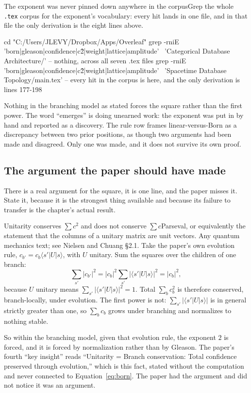 \begin{Correspondence}{The exponent was never pinned down anywhere in the corpus}{Grep the whole \texttt{.tex} corpus for the exponent's vocabulary: every hit lands in one file, and in that file the only derivation is the eight lines above.}
\begin{Check}
cd "C:/Users/JLEVY/Dropbox/Apps/Overleaf"
grep -rniE 'born|gleason|confidence|c\^2|weight|lattice|amplitude' \
     'Categorical Database Architecture/'
    -- nothing, across all seven .tex files
grep -rniE 'born|gleason|confidence|c\^2|weight|lattice|amplitude' \
     'Spacetime Database Topology/main.tex'
    -- every hit in the corpus is here, and the only derivation is lines 177-198
\end{Check}
Nothing in the branching model as stated forces the square rather than the first power. The word ``emerges'' is doing unearned work: the exponent was put in by hand and reported as a discovery. The rule row frames linear-versus-Born as a discrepancy between two prior positions, as though two arguments had been made and disagreed. Only one was made, and it does not survive its own proof.
\end{Correspondence}

\subsection{The argument the paper should have made}

There is a real argument for the square, it is one line, and the paper misses it. State it, because it is the strongest thing available and because its failure to transfer is the chapter's actual result.

\begin{Theorem}{Unitarity conserves $\sum c^2$ and does not conserve $\sum c$}{Parseval, or equivalently the statement that the columns of a unitary matrix are unit vectors. Any quantum mechanics text; see Nielsen and Chuang \S2.1.}
Take the paper's own evolution rule, $c_{b'} = c_b \langle s'|U|s\rangle$, with $U$ unitary. Sum the squares over the children of one branch:
\begin{equation}
\sum_{s'} |c_{b'}|^2 = |c_b|^2 \sum_{s'} |\langle s'|U|s\rangle|^2 = |c_b|^2,
\end{equation}
because $U$ unitary means $\sum_{s'} |\langle s'|U|s\rangle|^2 = 1$. Total $\sum_b c_b^2$ is therefore conserved, branch-locally, under evolution. The first power is not: $\sum_{s'} |\langle s'|U|s\rangle|$ is in general strictly greater than one, so $\sum_b c_b$ grows under branching and normalizes to nothing stable.

So within the branching model, given that evolution rule, the exponent $2$ is forced, and it is forced by normalization rather than by Gleason. The paper's fourth ``key insight'' reads ``Unitarity = Branch conservation: Total confidence preserved through evolution,'' which is this fact, stated without the computation and never connected to Equation~\ref{eq:born}. The paper had the argument and did not notice it was an argument.
\end{Theorem}

